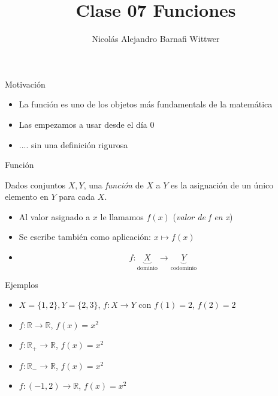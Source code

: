 \documentclass[14pt,aspectratio=169,xcolor=dvipsnames]{beamer}
\title[short title]{Clase 07 Funciones}
\subtitle{}
\author[NA Barnafi] {Nicolás Alejandro Barnafi Wittwer}
\institute[UC|CMM] 
{
    Pontificia Universidad Católica de Chile \\
    Centro de Modelamiento Matemático
}
\date{}
\begin{document}
\begin{frame}
    \maketitle
\end{frame}
\begin{frame}{Motivación}
    \begin{itemize}
        \item La función es uno de los objetos más fundamentals de la matemática
        \item Las empezamos a usar desde el día 0 
        \item .... sin una definición rigurosa
    \end{itemize}
    \vspace{1cm}
\end{frame}
\begin{frame}{Función}
    \begin{block}{}
        Dados conjuntos $X, Y$, una \emph{función} de $X$ a $Y$ es la asignación de un único elemento en $Y$ para cada $X$.
    \end{block}
    \begin{itemize}
        \item Al valor asignado a $x$ le llamamos $f(x)$ (\emph{valor de f en x})
        \item Se escribe también como aplicación: $x\mapsto f(x)$
        \item 
            $$ f: \underbrace{X}_\text{dominio} \to \underbrace{Y}_\text{codominio} $$
    \end{itemize}
\end{frame}
\begin{frame}{Ejemplos}
    \begin{itemize}
        \item $X=\{1,2\}, Y=\{2,3\}$, $f:X\to Y$ con $f(1)=2$, $f(2)=2$
        \item $f:\mathbb R \to \mathbb R$, $f(x) = x^2$
        \item $f:\mathbb R_+ \to \mathbb R$, $f(x) = x^2$
        \item $f:\mathbb R_- \to \mathbb R$, $f(x) = x^2$
        \item $f:(-1,2) \to \mathbb R$, $f(x) = x^2$
    \end{itemize}
\end{frame}
\end{document}
